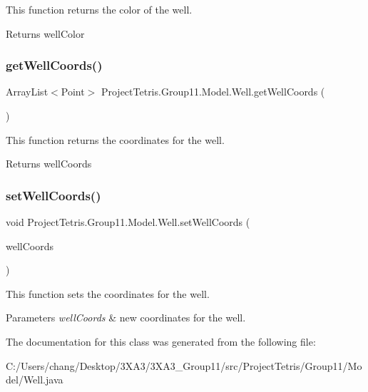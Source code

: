 This function returns the color of the well. 

\begin{DoxyReturn}{Returns}
well\+Color 
\end{DoxyReturn}
\hypertarget{class_project_tetris_1_1_group11_1_1_model_1_1_well_a16f565cb48b17ea4df866b05a2ea3b36}{}\label{class_project_tetris_1_1_group11_1_1_model_1_1_well_a16f565cb48b17ea4df866b05a2ea3b36} 
\subsubsection{\texorpdfstring{get\+Well\+Coords()}{getWellCoords()}}
{\footnotesize\ttfamily Array\+List$<$Point$>$ Project\+Tetris.\+Group11.\+Model.\+Well.\+get\+Well\+Coords (\begin{DoxyParamCaption}{ }\end{DoxyParamCaption})}



This function returns the coordinates for the well. 

\begin{DoxyReturn}{Returns}
well\+Coords 
\end{DoxyReturn}
\hypertarget{class_project_tetris_1_1_group11_1_1_model_1_1_well_a0d596baf44d364cba8a4f457d064c8cf}{}\label{class_project_tetris_1_1_group11_1_1_model_1_1_well_a0d596baf44d364cba8a4f457d064c8cf} 
\subsubsection{\texorpdfstring{set\+Well\+Coords()}{setWellCoords()}}
{\footnotesize\ttfamily void Project\+Tetris.\+Group11.\+Model.\+Well.\+set\+Well\+Coords (\begin{DoxyParamCaption}\item[{Array\+List$<$ Point $>$}]{well\+Coords }\end{DoxyParamCaption})}



This function sets the coordinates for the well. 


\begin{DoxyParams}{Parameters}
{\em well\+Coords} & new coordinates for the well. \\
\hline
\end{DoxyParams}


The documentation for this class was generated from the following file\+:\begin{DoxyCompactItemize}
\item 
C\+:/\+Users/chang/\+Desktop/3\+X\+A3/3\+X\+A3\+\_\+\+Group11/src/\+Project\+Tetris/\+Group11/\+Model/Well.\+java\end{DoxyCompactItemize}
